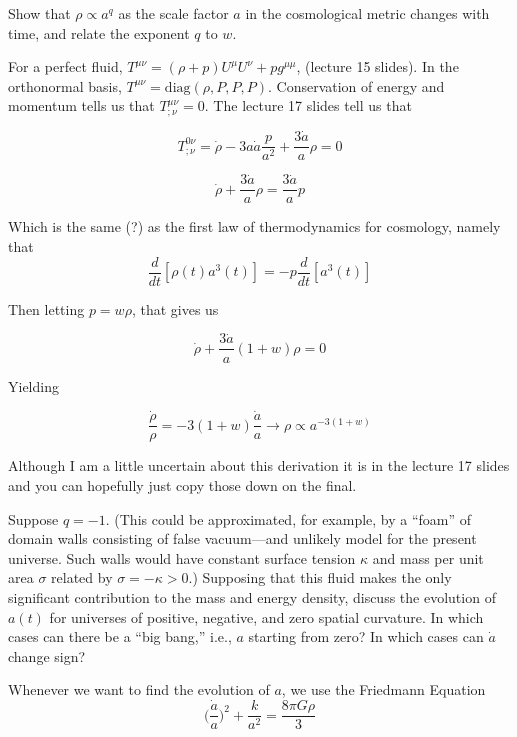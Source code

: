 \documentclass[11pt,largemargins]{homework}
\begin{document}
\begin{alphaparts}

\questionpart
Show that $\rho \propto a^q$ as the scale factor $a$ in the cosmological metric changes with time, and relate the exponent $q$ to $w$. 

For a perfect fluid, $T^{\mu \nu} = (\rho + p) U^{\mu} U^{\nu} + p g^{\mu \mu}$, (lecture 15 slides).  In the orthonormal basis, $T^{\mu \nu} = \mathrm{diag}(\rho, P, P, P)$.  Conservation of energy and momentum tells us that $T_{; \nu}^{\mu \nu} = 0$.  The lecture 17 slides tell us that

$$T_{; \nu}^{0 \nu} = \dot{\rho} - 3a\dot{a} \frac{p}{a^2} + \frac{3\dot{a}}{a} \rho = 0$$

$$\dot{\rho} + \frac{3\dot{a}}{a} \rho = \frac{3 \dot{a}}{a} p $$

Which is the same (?) as the first law of thermodynamics for cosmology, namely that 
\begin{equation}
\frac{d}{dt}[ \rho(t) a^3(t)] = -p \frac{d}{dt} [a^3(t)] 
\end{equation}

Then letting $p = w \rho$, that gives us

$$\dot{\rho} + \frac{3\dot{a}}{a}(1 + w) \rho = 0$$

Yielding

$$\frac{\dot{\rho}}{\rho} = -3(1 + w)\frac{\dot{a}}{a} \to \rho \propto a^{-3(1+w)} $$

Although I am a little uncertain about this derivation it is in the lecture 17 slides and you can hopefully just copy those down on the final.

\questionpart
Suppose $q = -1$.  (This could be approximated, for example, by a ``foam'' of domain walls consisting of false vacuum---and unlikely model for the present universe.  Such walls would have constant surface tension $\kappa$ and mass per unit area $\sigma$ related by $\sigma = -\kappa >0.$) Supposing that this fluid makes the only significant contribution to the mass and energy density, discuss the evolution of $a(t)$ for universes of positive, negative, and zero spatial curvature.  In which cases can there be a ``big bang,'' i.e., $a$ starting from zero?  In which cases can $\dot{a}$ change sign? 

Whenever we want to find the evolution of $a$, we use the Friedmann Equation 
\begin{equation}
\Big(\frac{\dot{a}}{a}\Big)^2 + \frac{k}{a^2} = \frac{8 \pi G \rho}{3}
\end{equation}


\end{alphaparts}
\end{document}
